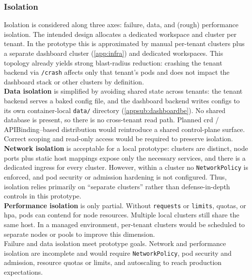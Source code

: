 \documentclass[11pt, a4paper, oneside, listof=totoc]{scrartcl}
\begin{document}
            \subsubsection{Isolation}\label{subsubsec:evalIsolation}
                Isolation is considered along three axes: failure, data, and (rough) performance
                isolation.
                The intended design allocates a dedicated workspace and cluster per tenant.
                In the prototype this is approximated by manual per-tenant clusters plus a separate
                dashboard cluster (\autoref{app:infra}) and dedicated workspaces.
                This topology already yields strong blast-radius reduction: crashing the tenant
                backend via \texttt{/crash} affects only that tenant’s pods and does not impact the
                dashboard stack or other clusters by definition.\\
                \textbf{Data isolation} is simplified by avoiding shared state across tenants: the
                tenant backend serves a baked config file, and the dashboard backend writes configs
                to its own container-local \texttt{data/} directory (\autoref{appsub:dashboardbe}).
                No shared database is present, so there is no cross-tenant read path.
                Planned \gls{crd} / APIBinding–based distribution would reintroduce a shared
                control-plane surface.
                Correct scoping and read-only access would be required to preserve isolation.\\
                \textbf{Network isolation} is acceptable for a local prototype: clusters are
                distinct, node ports plus static host mappings expose only the necessary services,
                and there is a dedicated ingress for every cluster.
                However, within a cluster no \texttt{NetworkPolicy} is enforced, and pod security
                or admission hardening is not configured.
                Thus, isolation relies primarily on “separate clusters” rather than defense-in-depth
                controls in this prototype.\\
                \textbf{Performance isolation} is only partial.
                Without \texttt{requests} or \texttt{limits}, quotas, or \gls{hpa}, pods can contend
                for node resources.
                Multiple local clusters still share the same host.
                In a managed environment, per-tenant clusters would be scheduled to separate
                nodes or pools to improve this dimension.\\
                Failure and data isolation meet prototype goals.
                Network and performance isolation are incomplete and would require
                \texttt{NetworkPolicy}, pod security and admission, resource quotas or limits, and
                autoscaling to reach production expectations.
\end{document}
